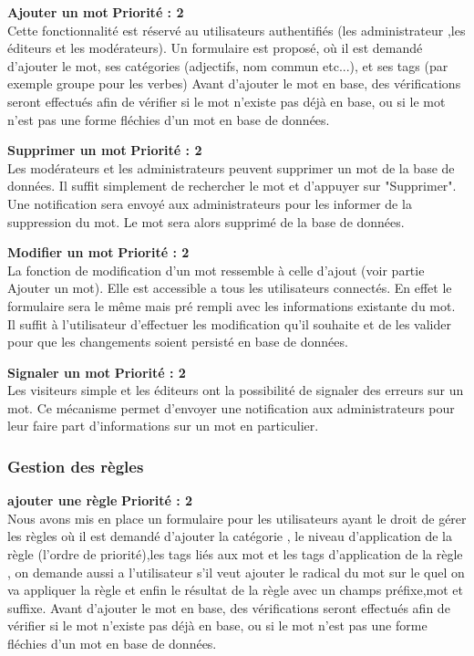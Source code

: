 \documentclass[12pt,a4paper]{article}
\begin{document}
\textbf{Ajouter un mot}
 \textbf{Priorité : 2}
\\ Cette fonctionnalité est réservé au utilisateurs authentifiés (les administrateur ,les éditeurs et les modérateurs). Un formulaire est proposé, où il est demandé d'ajouter le mot, ses catégories (adjectifs, nom commun etc...), et ses tags (par exemple groupe pour les verbes)
Avant d'ajouter le mot en base, des vérifications seront effectués afin  de vérifier si le mot n'existe pas déjà en base, ou si le mot n'est pas une forme fléchies d'un mot en base de données.


\textbf{Supprimer un mot}
 \textbf{Priorité : 2} \\ 
 Les modérateurs et les administrateurs peuvent supprimer un mot de la base de données. Il suffit simplement de rechercher le mot et d'appuyer sur "Supprimer". Une notification sera envoyé aux administrateurs pour les informer de la suppression du mot. Le mot sera alors supprimé de la base de données.

\textbf{Modifier un mot}
 \textbf{Priorité : 2} \\ 
 La fonction de modification d'un mot ressemble à celle d'ajout (voir partie Ajouter un mot). Elle est accessible a tous les utilisateurs connectés. En effet le formulaire sera le même mais pré rempli avec les informations existante du mot. Il suffit à  l'utilisateur d'effectuer les modification qu'il souhaite et de les valider pour que les changements soient persisté en base de données.

\textbf{Signaler un mot}
 \textbf{Priorité : 2}
 \\ Les visiteurs simple et les éditeurs ont la possibilité de signaler des erreurs sur un mot. Ce mécanisme permet d'envoyer une notification aux administrateurs pour leur faire part d'informations sur un mot en particulier. 
\subsubsection{Gestion des règles }
\textbf{ajouter une règle } \textbf{Priorité : 2} \\ Nous avons mis en place un formulaire pour les utilisateurs ayant le droit de gérer les règles où il est demandé d'ajouter la catégorie , le niveau d'application de la règle (l'ordre de priorité),les tags liés aux mot et les tags d'application de la règle , on demande aussi a l'utilisateur s'il veut ajouter le radical du mot sur le quel on va appliquer la règle et enfin le résultat de la règle avec un champs préfixe,mot et suffixe.
Avant d'ajouter le mot en base, des vérifications seront effectués afin  de vérifier si le mot n'existe pas déjà en base, ou si le mot n'est pas une forme fléchies d'un mot en base de données.
\end{document}
